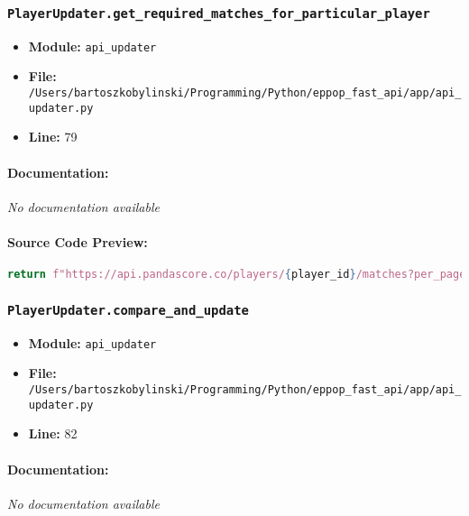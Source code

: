 \documentclass[11pt,a4paper]{article}
\begin{document}
\vspace{1em}
\subsubsection{\texttt{PlayerUpdater.get\_required\_matches\_for\_particular\_player}}

\begin{itemize}
    \item \textbf{Module:} \texttt{api\_updater}
    \item \textbf{File:} \texttt{/Users/bartoszkobylinski/Programming/Python/eppop\_fast\_api/app/api\_updater.py}
    \item \textbf{Line:} 79
\end{itemize}

\paragraph{Documentation:} \textit{No documentation available}

\paragraph{Source Code Preview:}
\begin{lstlisting}[language=Python]
        return f"https://api.pandascore.co/players/{player_id}/matches?per_page{required_amount_of_matches}&sort=-modified_at"
\end{lstlisting}

\vspace{1em}
\subsubsection{\texttt{PlayerUpdater.compare\_and\_update}}

\begin{itemize}
    \item \textbf{Module:} \texttt{api\_updater}
    \item \textbf{File:} \texttt{/Users/bartoszkobylinski/Programming/Python/eppop\_fast\_api/app/api\_updater.py}
    \item \textbf{Line:} 82
\end{itemize}

\paragraph{Documentation:} \textit{No documentation available}
\end{document}
